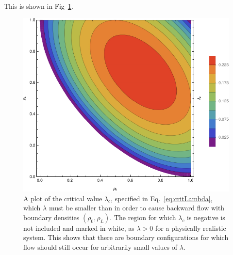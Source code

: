 This is shown in Fig~\ref{fig:critLambda}.
\begin{figure}[h!]
 \caption[The dependence of the critial value of $\lambda$ required for backward diffusion on the boundary conditions.]{\label{fig:critLambda} A plot of the critical value $\lambda_c$, specified in Eq.~\eqref{eq:critLambda},
 which $\lambda$ must be smaller than in order to cause backward flow with boundary densities $(\rho_0, \rho_L)$. The region for which $\lambda_c$ is negative is not included and marked in white, as $\lambda>0$ for a physically
 realistic system. This shows that there are boundary configurations for which flow should still occur for arbitrarily small values of $\lambda$.}
 \includegraphics[width=0.99\linewidth]{analytics/images/criticalLambda}
\end{figure}

